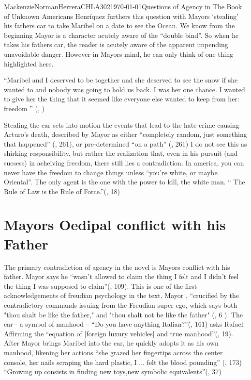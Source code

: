\documentclass{article}
\begin{document}
\begin{mla}{Mackenzie}{Norman}{Herrera}{CHLA302}{\today}{Questions of Agency in The Book of Unknown Americans}
Henríquez furthers this question with Mayors `stealing' his fathers car to take Maribel on a date to see the Ocean. We know from the beginning Mayor is a character acutely aware of the ``double bind''.  So when he takes his fathers car, the reader is acutely aware of the apparent impending unavoidable danger. However in Mayors mind, he can only think of one thing highlighted here.

``Maribel and I deserved to be together and she deserved to see the snow if she wanted to and nobody was going to hold us back. I was her one chance. I wanted to give her the thing that it seemed like everyone else wanted to keep from her: freedom '' (\cite{Henriquez2014-sh}, )

Stealing the car sets into motion the events that lead to the hate crime causing Arturo's death, described by Mayor as either ``completely random, just something that happened'' (\cite{Henriquez2014-sh}, 261), or pre-determined ``on a path'' (\cite{Henriquez2014-sh}, 261) I do not see this as shirking responsibility, but rather the realization that, even in his pursuit (and sucsess) in acheiving freedom, there still lies a contradiction. In america, you can never have the freedom to change things unless ``you're white, or maybe Oriental''. The only agent is the one with the power to kill, the white man. `` The Rule of Law is the Rule of Force.''(\cite{loves-bdy}, 18)

\section*{Mayors Oedipal conflict with his Father}

The primary contradiction of agency in the novel is Mayors conflict with his father. Mayor says he ``wasn’t allowed to claim the thing I felt and I didn’t feel the thing I was supposed to claim''(\cite{Henriquez2014-sh}, 109). This is one of the first acknowledgements of freudian psychology in the text, 
Mayor , ``crucified by the contradictory commands issuing from the Freudian super-ego, which says both "thou shalt be like the father," and "thou shalt not be like the father" (\cite{loves-bdy}, 6 ). The car - a symbol of manhood   -- ``Do you have anything Italian?''(\cite{Henriquez2014-sh}, 161) asks Rafael. Affirming the ``equation of [foreign luxury vehicles] and true manhood''(\cite{Uhlman2015-qx}, 19). After Mayor brings Maribel into the car, he quickly adopts it as his own manhood, likening her actions ``she grazed her fingertips across the center console, her nails scraping the hard plastic, I ... felt the blood pounding'' (\cite{Henriquez2014-sh}, 173) ``Growing up consists in finding new toys,new symbolic equivalents''(\cite{loves-bdy}, 37)






\end{mla}
\end{document}
